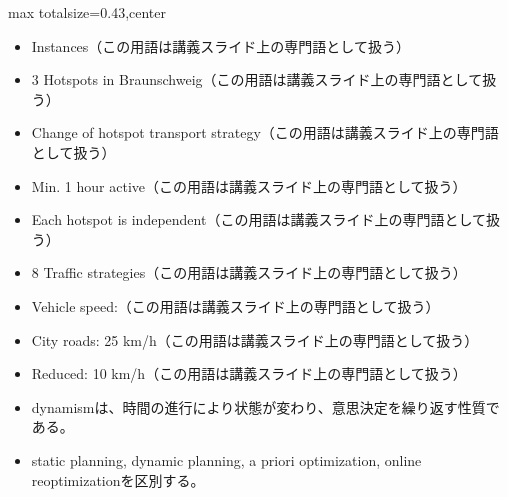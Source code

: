 \clearpage
{}
\begin{minipage}[t]{0.405\textwidth}
\begin{adjustbox}{max totalsize={\textwidth}{0.43\textheight},center}
\begin{minipage}{\textwidth}\scriptsize
{}\begin{itemize}
\item Instances（この用語は講義スライド上の専門語として扱う）
\item 3 Hotspots in Braunschweig（この用語は講義スライド上の専門語として扱う）
\item Change of hotspot transport strategy（この用語は講義スライド上の専門語として扱う）
\item Min. 1 hour active（この用語は講義スライド上の専門語として扱う）
\item Each hotspot is independent（この用語は講義スライド上の専門語として扱う）
\item 8 Traffic strategies（この用語は講義スライド上の専門語として扱う）
\item Vehicle speed:（この用語は講義スライド上の専門語として扱う）
\item City roads: 25 km/h（この用語は講義スライド上の専門語として扱う）
\item Reduced: 10 km/h（この用語は講義スライド上の専門語として扱う）
\end{itemize}\begin{itemize}
\item dynamismは、時間の進行により状態が変わり、意思決定を繰り返す性質である。
\item static planning, dynamic planning, a priori optimization, online reoptimizationを区別する。
\end{itemize}
\end{minipage}
\end{adjustbox}
\end{minipage}\hfill

